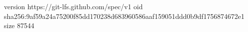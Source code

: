 version https://git-lfs.github.com/spec/v1
oid sha256:9af59a24a75200f85dd170238d683960586aaf159051ddd0b9df1756874672e1
size 87544
